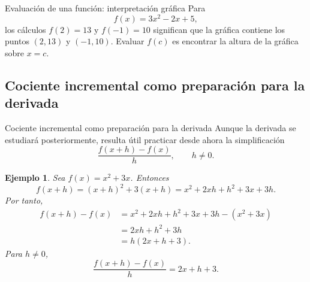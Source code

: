 \documentclass[aspectratio=169,10pt]{beamer}
\newtheorem{ejemplo}{Ejemplo}
\begin{document}
\begin{frame}{Evaluación de una función: interpretación gráfica}
Para
\[
f(x)=3x^2-2x+5,
\]
los cálculos $f(2)=13$ y $f(-1)=10$ significan que la gráfica contiene los
puntos $(2,13)$ y $(-1,10)$. Evaluar $f(c)$ es encontrar la altura de la
gráfica sobre $x=c$.
\begin{center}
\end{center}
\end{frame}

\subsection*{Cociente incremental como preparación para la derivada}
\begin{frame}{Cociente incremental como preparación para la derivada}
Aunque la derivada se estudiará posteriormente, resulta útil practicar desde
ahora la simplificación
\[
\frac{f(x+h)-f(x)}{h},\qquad h\neq0.
\]

\begin{ejemplo}
Sea $f(x)=x^2+3x$. Entonces
\[
f(x+h)=(x+h)^2+3(x+h)
=x^2+2xh+h^2+3x+3h.
\]
Por tanto,
\begin{align*}
f(x+h)-f(x)
&=x^2+2xh+h^2+3x+3h-(x^2+3x)\\
&=2xh+h^2+3h\\
&=h(2x+h+3).
\end{align*}
Para $h\neq0$,
\[
\frac{f(x+h)-f(x)}{h}=2x+h+3.
\]
\end{ejemplo}

\end{frame}
\end{document}
